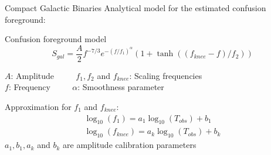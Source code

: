 \documentclass[pdf]{beamer}
\begin{document}
\begin{frame}{Compact Galactic Binaries}
Analytical model for the estimated confusion foreground:
\begin{block}{Confusion foreground model}
\begin{equation*}
S_{gal}  = \dfrac{A}{2} f^{-7/3} e^{-(f/f_1)^\alpha} (1+\tanh((f_{knee}-f)/f_2))
\end{equation*}
\end{block}
$A$: Amplitude $\qquad$ $f_1, f_2$ and $f_{knee}$: Scaling frequencies \\
$f$: Frequency $\qquad$ $\alpha$: Smoothness parameter 

Approximation for $f_1$ and $f_{knee}$:
\begin{align*}
\log_{10}(f_1) = a_1 \log_{10}(T_{obs}) +b_1\\
\log_{10}(f_{knee}) = a_k \log_{10}(T_{obs}) + b_k 
\end{align*}
$a_1, b_1, a_k$ and $b_k$ are amplitude calibration parameters
\end{frame}
\end{document}
